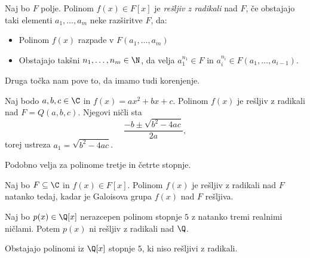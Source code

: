 \begin{definicija}
    Naj bo $F$ polje. Polinom $f(x) \in F[x]$ je
    \emph{rešljiv z radikali}
    nad $F$, če obstajajo taki elementi $a_1, \dots, a_m$
    neke razširitve $F$, da:
    \begin{itemize}
        \item Polinom $f(x)$ razpade v $F(a_1, \dots, a_m)$
        \item Obstajajo takšni $n_1, \dots, n_m \in \N$, da 
        velja $a_1^{n_1} \in F$ in $a_i^{n_i} \in 
        F(a_1, \dots, a_{i-1})$.
    \end{itemize}
\end{definicija}

\begin{opomba}
    Druga točka nam pove to, da imamo tudi korenjenje.
\end{opomba}

\begin{primer}
    Naj bodo $a, b, c \in \C$ in $f(x) = ax^2 + bx + c$. 
    Polinom $f(x)$ je rešljiv z radikali nad $F = Q(a, b, c)$.
    Njegovi ničli sta
    \[
        \frac{-b \pm \sqrt{b^2-4ac}}{2a},
    \]
    torej ustreza $a_1 = \sqrt{b^2 - 4ac}$.

    Podobno velja za polinome tretje in četrte stopnje.
\end{primer}

\begin{izrek}
    Naj bo $F \subseteq \C$ in $f(x) \in F[x]$. Polinom
    $f(x)$ je rešljiv z radikali nad $F$ natanko tedaj, 
    kadar je Galoisova grupa $f(x)$ nad $F$ rešljiva. 
\end{izrek}


\begin{lema}
    Naj bo $p(x) \in \Q[x]$ nerazcepen polinom stopnje $5$ 
    z natanko tremi realnimi ničlami. Potem $p(x)$ ni rešljiv
    z radikali nad $\Q$.
\end{lema}

%    

\begin{izrek}
    Obstajajo polinomi iz $\Q[x]$ stopnje $5$, ki niso 
    rešljivi z radikali.
\end{izrek}

%    
